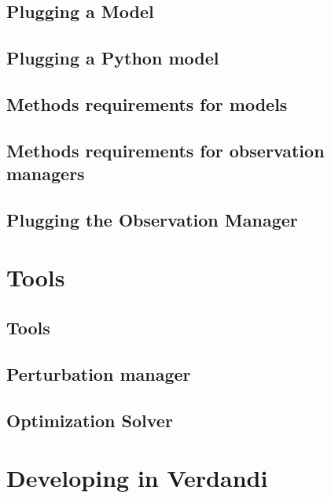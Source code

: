 \documentclass{book}
\begin{document}
\chapter{Plugging a Model}
\label{plugging_model}
\hypertarget{plugging_model}{}

\chapter{Plugging a Python model}
\label{plugging_python_model}
\hypertarget{plugging_python_model}{}

\chapter{Methods requirements for models}
\label{model_requirements}
\hypertarget{model_requirements}{}

\chapter{Methods requirements for observation managers}
\label{observation_requirements}
\hypertarget{observation_requirements}{}

\chapter{Plugging the Observation Manager}
\label{plugging_observation}
\hypertarget{plugging_observation}{}

\part{Tools}
\chapter{Tools}
\label{tools}
\hypertarget{tools}{}

\chapter{Perturbation manager}
\label{perturbation_manager}
\hypertarget{perturbation_manager}{}

\chapter{Optimization Solver}
\label{optimization_solver}
\hypertarget{optimization_solver}{}

\part{Developing in Verdandi}
\end{document}

